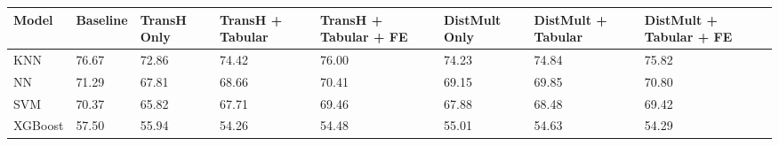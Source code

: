 \begin{tabular}{llllllll}
\toprule
Model & Baseline & TransH Only & TransH + Tabular & TransH + Tabular + FE & DistMult Only & DistMult + Tabular & DistMult + Tabular + FE \\
\midrule
KNN & 76.67 & 72.86 & 74.42 & 76.00 & 74.23 & 74.84 & 75.82 \\
NN & 71.29 & 67.81 & 68.66 & 70.41 & 69.15 & 69.85 & 70.80 \\
SVM & 70.37 & 65.82 & 67.71 & 69.46 & 67.88 & 68.48 & 69.42 \\
XGBoost & 57.50 & 55.94 & 54.26 & 54.48 & 55.01 & 54.63 & 54.29 \\
\bottomrule
\end{tabular}
